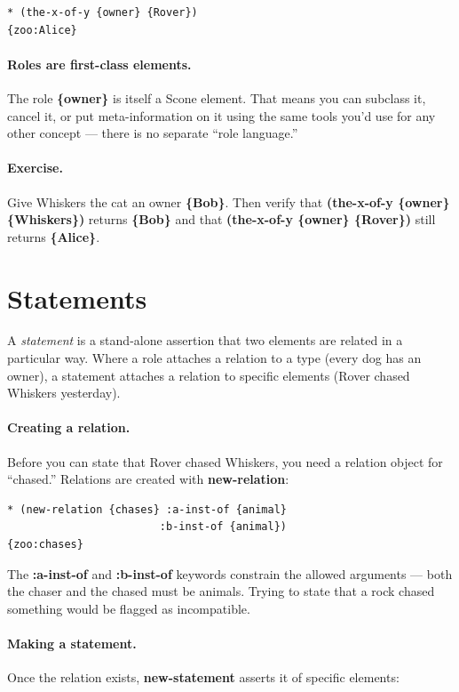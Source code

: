 \documentclass[titlepage,twoside,openright,11pt]{article}
\begin{document}
\begin{verbatim}
* (the-x-of-y {owner} {Rover})
{zoo:Alice}
\end{verbatim}

\paragraph{Roles are first-class elements.}
The role \textbf{\{owner\}} is itself a Scone element. That means
you can subclass it, cancel it, or put meta-information on it using
the same tools you'd use for any other concept --- there is no
separate ``role language.''

\paragraph{Exercise.}
Give Whiskers the cat an owner \textbf{\{Bob\}}. Then verify that
\textbf{(the-x-of-y \{owner\} \{Whiskers\})} returns \textbf{\{Bob\}}
and that \textbf{(the-x-of-y \{owner\} \{Rover\})} still returns
\textbf{\{Alice\}}.

\section{Statements}\label{statements}

A \emph{statement} is a stand-alone assertion that two elements are
related in a particular way. Where a role attaches a relation to a
type (every dog has an owner), a statement attaches a relation to
specific elements (Rover chased Whiskers yesterday).

\paragraph{Creating a relation.}
Before you can state that Rover chased Whiskers, you need a relation
object for ``chased.'' Relations are created with \textbf{new-relation}:

\begin{verbatim}
* (new-relation {chases} :a-inst-of {animal}
                        :b-inst-of {animal})
{zoo:chases}
\end{verbatim}

The \textbf{:a-inst-of} and \textbf{:b-inst-of} keywords constrain
the allowed arguments --- both the chaser and the chased must be
animals. Trying to state that a rock chased something would be
flagged as incompatible.

\paragraph{Making a statement.}
Once the relation exists, \textbf{new-statement} asserts it of
specific elements:
\end{document}

